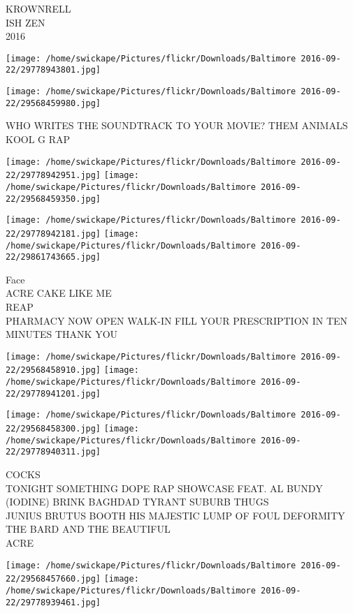 \documentclass[10pt,letterpaper]{article}
\begin{document}
KROWNRELL\\
ISH ZEN\\
2016
\pagebreak

\texttt{[image: /home/swickape/Pictures/flickr/Downloads/Baltimore 2016-09-22/29778943801.jpg]}

\vspace{0.25in}
\texttt{[image: /home/swickape/Pictures/flickr/Downloads/Baltimore 2016-09-22/29568459980.jpg]}

WHO WRITES THE SOUNDTRACK TO YOUR MOVIE?  THEM ANIMALS\\
KOOL G RAP
\pagebreak

\texttt{[image: /home/swickape/Pictures/flickr/Downloads/Baltimore 2016-09-22/29778942951.jpg]}
\texttt{[image: /home/swickape/Pictures/flickr/Downloads/Baltimore 2016-09-22/29568459350.jpg]}

\texttt{[image: /home/swickape/Pictures/flickr/Downloads/Baltimore 2016-09-22/29778942181.jpg]}
\texttt{[image: /home/swickape/Pictures/flickr/Downloads/Baltimore 2016-09-22/29861743665.jpg]}

Face\\
ACRE CAKE LIKE ME\\
REAP\\
PHARMACY NOW OPEN WALK{-}IN FILL YOUR PRESCRIPTION IN TEN MINUTES THANK YOU
\pagebreak

\texttt{[image: /home/swickape/Pictures/flickr/Downloads/Baltimore 2016-09-22/29568458910.jpg]}
\texttt{[image: /home/swickape/Pictures/flickr/Downloads/Baltimore 2016-09-22/29778941201.jpg]}

\texttt{[image: /home/swickape/Pictures/flickr/Downloads/Baltimore 2016-09-22/29568458300.jpg]}
\texttt{[image: /home/swickape/Pictures/flickr/Downloads/Baltimore 2016-09-22/29778940311.jpg]}

COCKS\\
TONIGHT SOMETHING DOPE RAP SHOWCASE FEAT. AL BUNDY (IODINE) BRINK BAGHDAD TYRANT SUBURB THUGS\\
JUNIUS BRUTUS BOOTH HIS MAJESTIC LUMP OF FOUL DEFORMITY THE BARD AND THE BEAUTIFUL\\
ACRE
\pagebreak

\texttt{[image: /home/swickape/Pictures/flickr/Downloads/Baltimore 2016-09-22/29568457660.jpg]}
\texttt{[image: /home/swickape/Pictures/flickr/Downloads/Baltimore 2016-09-22/29778939461.jpg]}
\end{document}
